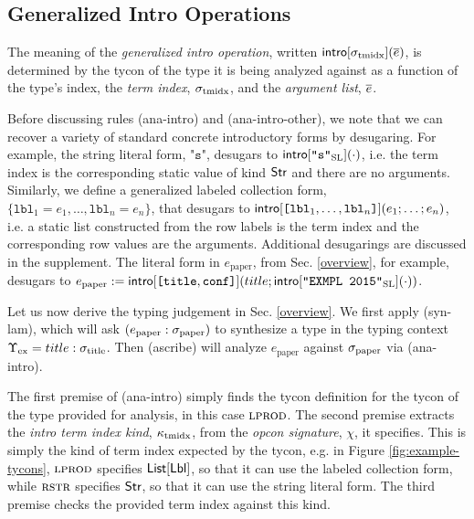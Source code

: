 \documentclass[pldi]{sigplanconf-pldi15}
\begin{document}
\subsection{Generalized Intro Operations}\label{sec:introop}
\noindent The meaning of the \emph{generalized intro operation}, written $\small\eintro{\sttmidx}{\es}$, is determined by the tycon of the type it is being analyzed against as a function of the type's index, the \emph{term index}, $\sigma_\text{tmidx}$, and the \emph{argument list}, $\overline{e}$.

Before discussing rules (ana-intro) and (ana-intro-other), we note that we can recover a variety of standard concrete introductory forms by desugaring. For example, the string literal form, $\texttt{"s"}$, desugars to ${\sf intro}[\texttt{"s"}_\text{SL}](\cdot)$, i.e. the term index is the corresponding static value of kind ${\sf Str}$ and there are no arguments. Similarly, we define a generalized labeled collection form, $\{\mathtt{lbl}_1=e_1, \ldots, \mathtt{lbl}_n=e_n\}$, that desugars to ${\sf intro}[\texttt{[}\mathtt{lbl}_1, \ldots, \mathtt{lbl}_n\texttt{]}](e_1; \ldots; e_n)$, i.e. a static list constructed from the row labels is the term index and the corresponding row values are the arguments. Additional desugarings are discussed in the supplement. The literal form in $e_\text{paper}$, from Sec. \ref{overview}, for example, desugars to $e_\text{paper}:={\sf intro}[\texttt{[}\texttt{title}, \texttt{conf}\texttt{]}](title; {\sf intro}[\texttt{"EXMPL 2015"}_\text{SL}](\cdot))$. %

Let us now derive the typing judgement in Sec. \ref{overview}. We first apply (syn-lam), which will ask $(e_\text{paper} : \sigma_\text{paper})$ to synthesize a type in the typing context $\Upsilon_\text{ex}=title : \sigma_\text{title}$. Then (ascribe) will analyze $e_\text{paper}$ against $\sigma_\text{paper}$ via (ana-intro). 

The first premise of (ana-intro) simply finds the tycon definition for the tycon of the type provided for analysis, in this case $\textsc{lprod}$. %
The second premise extracts the \emph{intro term index kind}, $\kappa_\text{tmidx}$, from the \emph{opcon signature}, $\chi$, it specifies. This is simply the kind of term index expected by the tycon, e.g. in Figure \ref{fig:example-tycons}, $\textsc{lprod}$ specifies ${\sf List}[{\sf Lbl}]$, so that it can use the labeled collection form, while $\textsc{rstr}$ specifies  ${\sf Str}$, so that it can use the string literal form. The third premise checks the provided term index against this kind.  %
\end{document}

